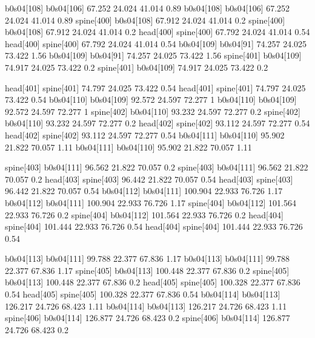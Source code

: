 b0s04[108]    b0s04[106]    67.252    24.024    41.014    0.89
b0s04[108]    b0s04[106]    67.252    24.024    41.014    0.89
spine[400]    b0s04[108]    67.912    24.024    41.014    0.2
spine[400]    b0s04[108]    67.912    24.024    41.014    0.2
head[400]    spine[400]    67.792    24.024    41.014    0.54
head[400]    spine[400]    67.792    24.024    41.014    0.54
b0s04[109]    b0s04[91]    74.257    24.025    73.422    1.56
b0s04[109]    b0s04[91]    74.257    24.025    73.422    1.56
spine[401]    b0s04[109]    74.917    24.025    73.422    0.2
spine[401]    b0s04[109]    74.917    24.025    73.422    0.2


head[401]    spine[401]    74.797    24.025    73.422    0.54
head[401]    spine[401]    74.797    24.025    73.422    0.54
b0s04[110]    b0s04[109]    92.572    24.597    72.277    1
b0s04[110]    b0s04[109]    92.572    24.597    72.277    1
spine[402]    b0s04[110]    93.232    24.597    72.277    0.2
spine[402]    b0s04[110]    93.232    24.597    72.277    0.2
head[402]    spine[402]    93.112    24.597    72.277    0.54
head[402]    spine[402]    93.112    24.597    72.277    0.54
b0s04[111]    b0s04[110]    95.902    21.822    70.057    1.11
b0s04[111]    b0s04[110]    95.902    21.822    70.057    1.11


spine[403]    b0s04[111]    96.562    21.822    70.057    0.2
spine[403]    b0s04[111]    96.562    21.822    70.057    0.2
head[403]    spine[403]    96.442    21.822    70.057    0.54
head[403]    spine[403]    96.442    21.822    70.057    0.54
b0s04[112]    b0s04[111]    100.904    22.933    76.726    1.17
b0s04[112]    b0s04[111]    100.904    22.933    76.726    1.17
spine[404]    b0s04[112]    101.564    22.933    76.726    0.2
spine[404]    b0s04[112]    101.564    22.933    76.726    0.2
head[404]    spine[404]    101.444    22.933    76.726    0.54
head[404]    spine[404]    101.444    22.933    76.726    0.54


b0s04[113]    b0s04[111]    99.788    22.377    67.836    1.17
b0s04[113]    b0s04[111]    99.788    22.377    67.836    1.17
spine[405]    b0s04[113]    100.448    22.377    67.836    0.2
spine[405]    b0s04[113]    100.448    22.377    67.836    0.2
head[405]    spine[405]    100.328    22.377    67.836    0.54
head[405]    spine[405]    100.328    22.377    67.836    0.54
b0s04[114]    b0s04[113]    126.217    24.726    68.423    1.11
b0s04[114]    b0s04[113]    126.217    24.726    68.423    1.11
spine[406]    b0s04[114]    126.877    24.726    68.423    0.2
spine[406]    b0s04[114]    126.877    24.726    68.423    0.2


